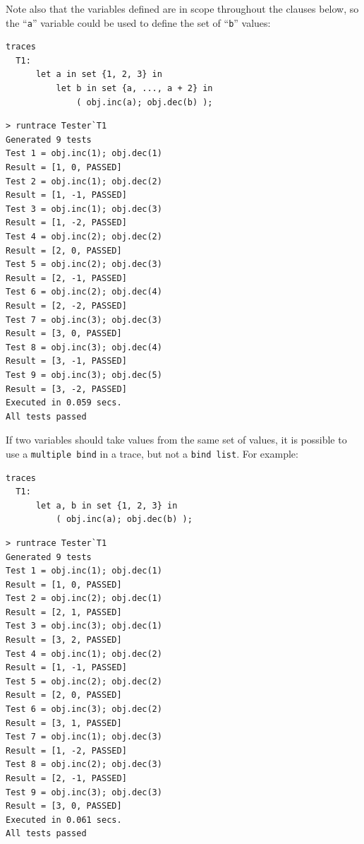 \documentclass{overturerepchap}
\begin{document}
\noindent Note also that the variables defined are in scope
throughout the clauses below, so the ``\texttt{a}'' variable could be used to define the
set of ``\texttt{b}'' values:

\small
\begin{lstlisting}
traces
  T1:
      let a in set {1, 2, 3} in
          let b in set {a, ..., a + 2} in
              ( obj.inc(a); obj.dec(b) );
\end{lstlisting}

\lstset{style=tool,language=}
\begin{lstlisting}[escapechar=@]
> runtrace Tester`T1
Generated 9 tests
Test 1 = obj.inc(1); obj.dec(1)
Result = [1, 0, PASSED]
Test 2 = obj.inc(1); obj.dec(2)
Result = [1, -1, PASSED]
Test 3 = obj.inc(1); obj.dec(3)
Result = [1, -2, PASSED]
Test 4 = obj.inc(2); obj.dec(2)
Result = [2, 0, PASSED]
Test 5 = obj.inc(2); obj.dec(3)
Result = [2, -1, PASSED]
Test 6 = obj.inc(2); obj.dec(4)
Result = [2, -2, PASSED]
Test 7 = obj.inc(3); obj.dec(3)
Result = [3, 0, PASSED]
Test 8 = obj.inc(3); obj.dec(4)
Result = [3, -1, PASSED]
Test 9 = obj.inc(3); obj.dec(5)
Result = [3, -2, PASSED]
Executed in 0.059 secs. 
All tests passed
\end{lstlisting}
\lstset{style=mystyle}
\lstset{language=VDM++}
\normalsize

\noindent If two variables should take values from the same set of values, it is possible
to use a \texttt{multiple bind} in a trace, but not a \texttt{bind list}. For
example:

\small
\begin{lstlisting}
traces
  T1:
      let a, b in set {1, 2, 3} in
          ( obj.inc(a); obj.dec(b) );
\end{lstlisting}

\lstset{style=tool,language=}
\begin{lstlisting}[escapechar=@]
> runtrace Tester`T1
Generated 9 tests
Test 1 = obj.inc(1); obj.dec(1)
Result = [1, 0, PASSED]
Test 2 = obj.inc(2); obj.dec(1)
Result = [2, 1, PASSED]
Test 3 = obj.inc(3); obj.dec(1)
Result = [3, 2, PASSED]
Test 4 = obj.inc(1); obj.dec(2)
Result = [1, -1, PASSED]
Test 5 = obj.inc(2); obj.dec(2)
Result = [2, 0, PASSED]
Test 6 = obj.inc(3); obj.dec(2)
Result = [3, 1, PASSED]
Test 7 = obj.inc(1); obj.dec(3)
Result = [1, -2, PASSED]
Test 8 = obj.inc(2); obj.dec(3)
Result = [2, -1, PASSED]
Test 9 = obj.inc(3); obj.dec(3)
Result = [3, 0, PASSED]
Executed in 0.061 secs. 
All tests passed
\end{lstlisting}
\lstset{style=mystyle}
\lstset{language=VDM++}
\normalsize
\end{document}

